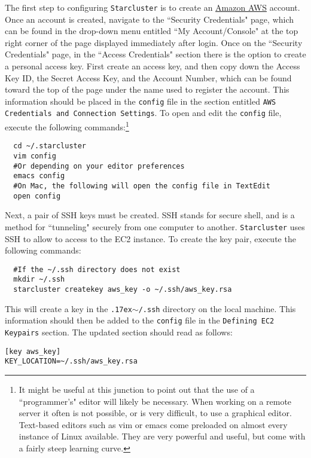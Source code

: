 \documentclass[12pt, letterpaper]{article}
\newcommand{\ntilde}{{\raise.17ex\hbox{$\scriptstyle\sim$}}}
\begin{document}
The first step to configuring \texttt{Starcluster} is to create an \href{https://aws.amazon.com/}{Amazon AWS} 
account. Once an account is created, navigate to the ``Security Credentials" page, 
which can be found in the drop-down menu entitled ``My Account/Console" at the top right corner of the
page displayed immediately after login. Once on the ``Security 
Credentials" page, in the ``Access Credentials" section there is the option to create a 
personal access key. First create an access key, and then copy down the Access Key ID, the Secret Access 
Key, and the Account Number, which can be found toward the top of the page 
under the name used to register the account. This information should be placed in the \texttt{config} file 
in the section entitled \texttt{AWS Credentials and Connection Settings}. To open and edit the \texttt{config}
file, execute the following commands:\footnote{It might be useful at this junction to point out
that the use of a ``programmer's" editor will likely be necessary. When working on a remote
server it often is not possible, or is very difficult, to use a graphical editor. Text-based editors
such as vim or emacs come preloaded on almost every instance of Linux available. They are 
very powerful and useful, but come with a fairly steep learning curve.}

\begin{verbatim}
  cd ~/.starcluster
  vim config
  #Or depending on your editor preferences
  emacs config
  #On Mac, the following will open the config file in TextEdit
  open config
\end{verbatim}

Next, a pair of SSH keys must be created. SSH stands for secure shell, and is a method for ``tunneling" securely
from one computer to another. \texttt{Starcluster} uses SSH to allow to access to the EC2 instance.
To create the key pair, execute the following commands:

\begin{verbatim}
  #If the ~/.ssh directory does not exist
  mkdir ~/.ssh
  starcluster createkey aws_key -o ~/.ssh/aws_key.rsa
\end{verbatim}

\noindent
This will create a key in the \texttt{\ntilde/.ssh} directory on the local machine. This 
information should then be added to the \texttt{config} file in the \texttt{Defining EC2 Keypairs}
section. The updated section should read as follows:

\begin{verbatim}
[key aws_key]
KEY_LOCATION=~/.ssh/aws_key.rsa
\end{verbatim}
\end{document}
